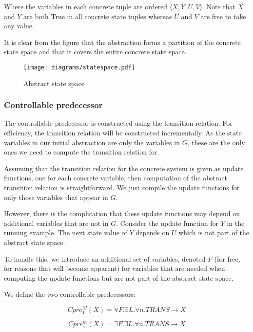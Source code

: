 Where the variables in each concrete tuple are ordered $\langle X, Y, U, V \rangle$. Note that $X$ and $Y$ are both True in all concrete state tuples whereas $U$ and $V$ are free to take any value.

It is clear from the figure that the abstraction forms a partition of the concrete state space and that it covers the entire concrete state space.

\begin{figure}[t]
\centering
\texttt{[image: diagrams/statespace.pdf]}
\caption{Abstract state space}
\label{fig:abs_state_sp}
\end{figure}

\subsubsection{Controllable predecessor}

The controllable predecessor is constructed using the transition relation. For efficiency, the transition relation will be constructed incrementally. As the state variables in our initial abstraction are only the variables in $G$, these are the only ones we need to compute the transition relation for.

Assuming that the transition relation for the concrete system is given as update functions, one for each concrete variable, then computation of the abstract transition relation is straightforward. We just compile the update functions for only those variables that appear in $G$.

However, there is the complication that these update functions may depend on additional variables that are not in $G$. Consider the update function for $Y$ in the running example. The next state value of $Y$ depends on $U$ which is not part of the abstract state space.

To handle this, we introduce an additional set of variables, denoted $F$ (for free, for reasons that will become apparent) for variables that are needed when computing the update functions but are not part of the abstract state space.

We define the two controllable predecessors:

\begin{equation}
    \label{eqn:symb_cpre_M}
    Cpre_1^M(X) = \forall F. \exists L. \forall n. TRANS \rightarrow X
\end{equation}

\begin{equation}
    \label{eqn:symb_cpre_m}
    Cpre_1^m(X) = \exists F. \exists L. \forall n. TRANS \rightarrow X
\end{equation}


